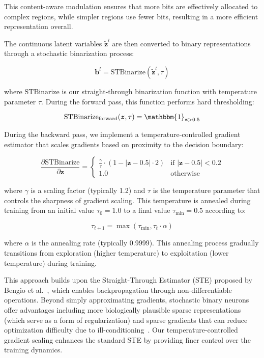 \documentclass[10pt,twocolumn,letterpaper]{article}
\newcommand{\bm}[1]{\boldsymbol{#1}}
\newcommand{\latent}{\bm{z}}
\newcommand{\binary}{\bm{b}}
\begin{document}
This content-aware modulation ensures that more bits are effectively allocated to complex regions, while simpler regions use fewer bits, resulting in a more efficient representation overall.

The continuous latent variables $\tilde{\latent}^l$ are then converted to binary representations through a stochastic binarization process:

\begin{equation}
\binary^l = \text{STBinarize}(\tilde{\latent}^l, \tau)
\end{equation}

where $\text{STBinarize}$ is our straight-through binarization function with temperature parameter $\tau$. During the forward pass, this function performs hard thresholding:

\begin{equation}
\text{STBinarize}_{\text{forward}}(\latent, \tau) = \mathbbm{1}_{\latent > 0.5}
\end{equation}

During the backward pass, we implement a temperature-controlled gradient estimator that scales gradients based on proximity to the decision boundary:

\begin{equation}
\frac{\partial \text{STBinarize}}{\partial \latent} = 
\begin{cases}
\frac{\gamma}{\tau} \cdot (1 - |\latent - 0.5| \cdot 2) & \text{if } |\latent - 0.5| < 0.2 \\
1.0 & \text{otherwise}
\end{cases}
\end{equation}

where $\gamma$ is a scaling factor (typically 1.2) and $\tau$ is the temperature parameter that controls the sharpness of gradient scaling. This temperature is annealed during training from an initial value $\tau_0 = 1.0$ to a final value $\tau_{\text{min}} = 0.5$ according to:

\begin{equation}
\tau_{t+1} = \max(\tau_{\text{min}}, \tau_t \cdot \alpha)
\end{equation}

where $\alpha$ is the annealing rate (typically 0.9999). This annealing process gradually transitions from exploration (higher temperature) to exploitation (lower temperature) during training.

This approach builds upon the Straight-Through Estimator (STE) proposed by Bengio et al.~\cite{bengio2013estimating, bengio2013propagating}, which enables backpropagation through non-differentiable operations. Beyond simply approximating gradients, stochastic binary neurons offer advantages including more biologically plausible sparse representations (which serve as a form of regularization) and sparse gradients that can reduce optimization difficulty due to ill-conditioning~\cite{bengio2013estimating}. Our temperature-controlled gradient scaling enhances the standard STE by providing finer control over the training dynamics.
\end{document}
